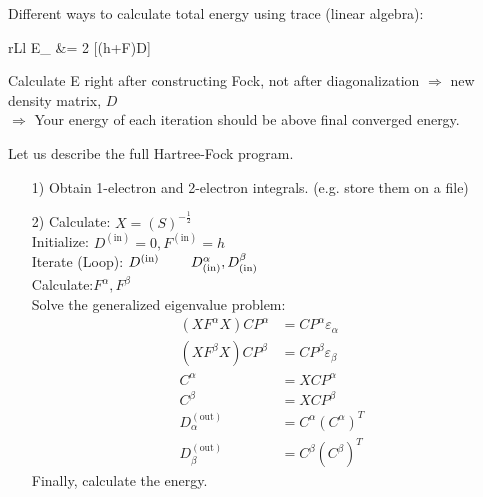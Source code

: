 \documentclass[a4paper, 12pt]{article}
\begin{document}
Different ways to calculate total energy using trace (linear algebra): 
	\begin{IEEEeqnarray}{rLl}	
E_{} &= 2\times {} [(h+F)D]
	\end{IEEEeqnarray}
\tab Calculate E right after constructing Fock, not after diagonalization $\Longrightarrow$ new density matrix, $D$\\
\tab $\Longrightarrow$ Your energy of each iteration should be above final converged energy.

Let us describe the full Hartree-Fock program.


	\begin{enumerate}    
\item[1)] Obtain 1-electron and 2-electron integrals. (e.g. store them on a file)
\item[2)] Calculate: \tab\tab\tab \tab$X= (S)^{-\frac{1}{2}}$\\
Initialize:  \tab\tab\tab\tab $ D^{(\text{in})}=0, F^{(\text{in})}=h$\\
Iterate (Loop): \tab\tab\tab $D^{(\text{in})} \hspace*{0.8cm} D_{(\text{in})}^{\alpha},D_{(\text{in})}^{\beta} $\\
Calculate:\tab\tab\tab\tab $F^\alpha,  F^\beta $\\
 Solve the generalized eigenvalue problem: 
     \begin{align*} 
(XF^\alpha X)CP^\alpha &=CP^\alpha \varepsilon_{\alpha} \\
(XF^\beta X)CP^\beta &=CP^\beta \varepsilon_{\beta} \\
C^\alpha &= XCP^\alpha \\
C^\beta &= XCP^\beta \\
D_\alpha^{(\text{out})}&= C^\alpha(C^\alpha )^T \\
D_\beta^{(\text{out})}&= C^\beta(C^\beta )^T 
    \end{align*}
Finally, calculate the energy.



\end{enumerate}
\end{document}
